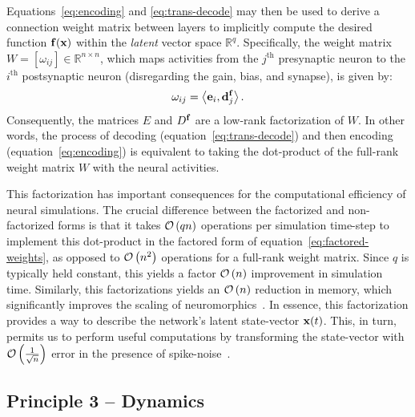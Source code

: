 Equations~\ref{eq:encoding} and \ref{eq:trans-decode} may then be used to derive a connection weight matrix between layers to implicitly compute the desired function $\mathbf{f}(\mathbf{x})$ within the \emph{latent} vector space $\mathbb{R}^q$.
Specifically, the weight matrix $W = [\omega_{ij}] \in \mathbb{R}^{n \times n}$, which maps activities from the $j^{\text{th}}$ presynaptic neuron to the $i^{\text{th}}$ postsynaptic neuron (disregarding the gain, bias, and synapse), is given by:
\begin{equation} \label{eq:factored-weights}
\omega_{ij} = \left\langle \V{e}_i, \V{d}^\V{f}_j \right\rangle \text{.} %
\end{equation}
Consequently, the matrices $E$ and $D^{\mathbf{f}}$ are a low-rank factorization of $W$.
In other words, the process of decoding (equation~\ref{eq:trans-decode}) and then encoding (equation~\ref{eq:encoding}) is equivalent to taking the dot-product of the full-rank weight matrix $W$ with the neural activities.

This factorization has important consequences for the computational efficiency of neural simulations.
The crucial difference between the factorized and non-factorized forms is that it takes $\mathcal{O}\left({q n}\right)$ operations per simulation time-step to implement this dot-product in the factored form of equation~\ref{eq:factored-weights}, as opposed to $\mathcal{O}\left({ n^2 }\right)$ operations for a full-rank weight matrix.
Since $q$ is typically held constant, this yields a factor $\mathcal{O}\left({ n }\right)$ improvement in simulation time.
Similarly, this factorizations yields an $\mathcal{O}\left({ n }\right)$ reduction in memory, which significantly improves the scaling of neuromorphics~\citep{mundy2015efficient}.
In essence, this factorization provides a way to describe the network's latent state-vector $\mathbf{x}(t)$.
This, in turn, permits us to perform useful computations by transforming the state-vector with $\mathcal{O}\left({ \frac{1}{\sqrt{n}} }\right)$ error in the presence of spike-noise~\citep[][p.~47]{eliasmith2003a}.

\subsection{Principle 3 -- Dynamics}
\label{sec:principle3}

